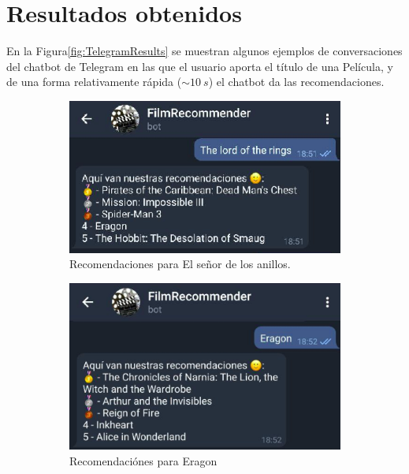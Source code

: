 \section{Resultados obtenidos}

En la Figura\ref{fig:TelegramResults} se muestran algunos ejemplos de conversaciones del chatbot de Telegram en las que el usuario aporta el título de una Película, y de una forma relativamente rápida ($\sim 10\ s$) el chatbot da las recomendaciones.\\


\begin{figure}[H]
\begin{subfigure}{.5\textwidth}
  \centering
  \includegraphics[width=.9\linewidth]{contenido/imagenes/sc1.png}
  \caption{Recomendaciones para El señor de los anillos.}
  \label{fig:sc1}
\end{subfigure}%
\begin{subfigure}{.5\textwidth}
  \centering
  \includegraphics[width=.9\linewidth]{contenido/imagenes/sc2.png}
  \caption{Recomendaciónes para Eragon}
  \label{fig:sc2}
\end{subfigure}
\\
\begin{subfigure}{.5\textwidth}

\end{subfigure}
\end{figure}

